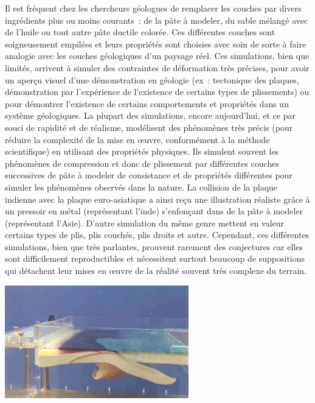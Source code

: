 \documentclass[a4paper,11pt]{article}
\begin{document}
Il est fréquent chez les chercheurs géologues de remplacer les couches par divers ingrédients plus ou moins courants~: de la pâte à modeler, du sable mélangé avec de l'huile ou tout autre pâte ductile colorée.
Ces différentes couches sont soigneusement empilées et leurs propriétés sont choisies avec soin de sorte à faire analogie avec les couches géologiques d'un paysage réel.
Ces simulations, bien que limités, arrivent à simuler des contraintes de déformation très précises, pour avoir un aperçu visuel d'une démonstration en géologie (ex~: tectonique des plaques, démonstration par l'expérience de l'existence de certains types de plissements) ou pour démontrer l'existence de certains comportements et propriétés dans un système géologiques.
La plupart des simulations, encore aujourd'hui, et ce par souci de rapidité et de réalisme, modélisent des phénomènes très précis (pour réduire la complexité de la mise en œuvre, conformément à la méthode scientifique) en utilisant des propriétés physiques.
Ils simulent souvent les phénomènes de compression et donc de plissement par différentes couches successives de pâte à modeler de consistance et de propriétés différentes pour simuler les phénomènes observés dans la nature.
La collision de la plaque indienne avec la plaque euro-asiatique a ainsi reçu une illustration réaliste grâce à un pressoir en métal (représentant l'inde) s'enfonçant dans de la pâte à modeler (représentant l'Asie).
D'autre simulation du même genre mettent en valeur certains types de plis, plis couchés, plis droits et autre. Cependant, ces différentes simulations, bien que très parlantes, prouvent rarement des conjectures car elles sont difficilement reproductibles et nécessitent surtout beaucoup de suppositions qui détachent leur mises en œuvre de la réalité souvent très complexe du terrain.

\begin{center}
  \includegraphics[width=8cm]{Images/simulation_physique.png}
\end{center}
\end{document}
